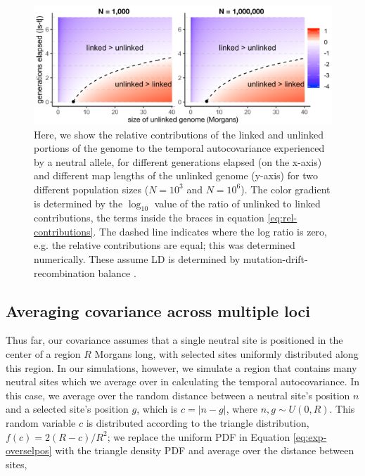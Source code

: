 \documentclass[11pt]{article}
\begin{document}
\begin{figure}[!ht]
  \centering
  \includegraphics[]{./images/unlinked_linked_contributions.pdf}

  \caption{Here, we show the relative contributions of the linked and unlinked
    portions of the genome to the temporal autocovariance experienced by a
    neutral allele, for different generations elapsed (on the x-axis) and
    different map lengths of the unlinked genome (y-axis) for two different
    population sizes ($N=10^3$ and $N=10^6$). The color gradient is determined
    by the $\log_{10}$ value of the ratio of unlinked to linked contributions,
    the terms inside the braces in equation \eqref{eq:rel-contributions}. The
    dashed line indicates where the log ratio is zero, e.g. the relative
    contributions are equal; this was determined numerically. These assume LD
    is determined by mutation-drift-recombination balance
  \parencite{Tomoko_Ohta1971-hb}.}

  \label{fig:linked-unlinked}
\end{figure}


\subsection{Averaging covariance across multiple loci}

Thus far, our covariance assumes that a single neutral site is positioned in
the center of a region $R$ Morgans long, with selected sites uniformly
distributed along this region. In our simulations, however, we simulate a
region that contains many neutral sites which we average over in calculating
the temporal autocovariance. In this case, we average over the random distance
between a neutral site's position $n$ and a selected site's position $g$, which
is $c = |n - g|$, where $n, g \sim U(0, R)$. This random variable $c$ is
distributed according to the triangle distribution, $f(c) = 2(R-c) / R^2$; we
replace the uniform PDF in Equation \eqref{eq:exp-overselpos} with the triangle
density PDF and average over the distance between sites,
\end{document}
